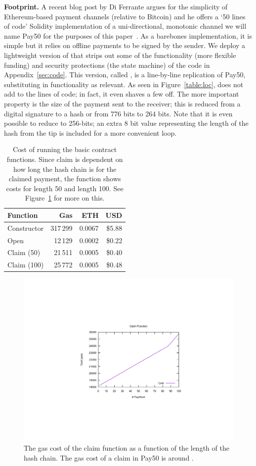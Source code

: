 \textbf{Footprint.} A recent blog post by Di Ferrante argues for the simplicity of Ethereum-based payment channels (relative to Bitcoin) and he offers a `50 lines of code' Solidity implementation of a uni-directional, monotonic channel we will name \textsf{Pay50} for the purposes of this paper~\cite{DF17}. As a barebones implementation, it is simple but it relies on offline payments to be signed by the sender. We deploy a lightweight version of \ew that strips out some of the functionality (\eg more flexible funding) and security protections (\eg the state machine) of the code in Appendix~\ref{sec:code}. This version, called \eww, is a line-by-line replication of \textsf{Pay50}, substituting in \ew functionality as relevant. As seen in Figure~\ref{table:loc}, \eww does not add to the lines of code; in fact, it even shaves a few off. The more important property is the size of the payment sent to the receiver; this is reduced from a digital signature to a hash or from 776 bits to 264 bits. Note that it is even possible to reduce \eww to 256-bits; an extra 8 bit value representing the length of the hash from the tip is included for a more convenient loop.


\begin{table}[t]          
\centering
\begin{tabular}{ l | r | r | r }
Function & Gas & ETH & USD \\ \hline
Constructor 		&317\,299  	& 0.0067 	& \$5.88 \\
Open 			&12\,129 		& 0.0002 	& \$0.22 \\ 
Claim (50) 		&21\,511  	& 0.0005 	& \$0.40 \\
Claim (100) 		&25\,772  	& 0.0005 	& \$0.48 \\ 
\end{tabular}
\caption{Cost of running the basic contract functions. Since claim is dependent on how long the hash chain is for the claimed payment, the function shows costs for length 50 and length 100. See Figure~\ref{fig:gas} for more on this.\label{table:gas}}
\end{table}

\begin{figure}[t]
\centering
\includegraphics[width=0.6\linewidth]{figures/gas.pdf}
\caption{The gas cost of the claim function as a function of the length of the hash chain. The gas cost of a claim in \textsf{Pay50} is around .\label{fig:gas}}
\end{figure}


